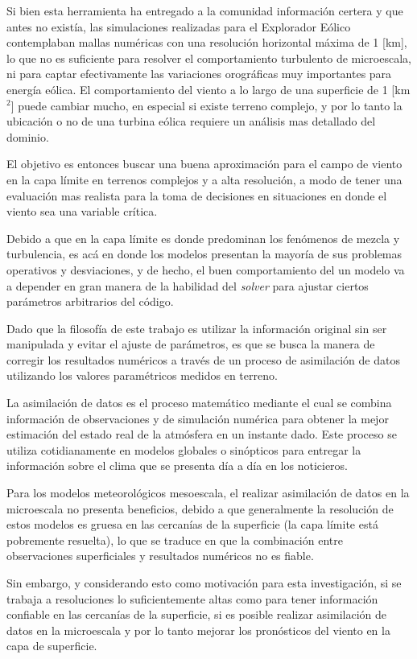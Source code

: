 Si bien esta herramienta ha entregado a la comunidad información certera y que antes no existía, las simulaciones realizadas para el Explorador Eólico contemplaban mallas numéricas con una resolución horizontal máxima de 1 [km], lo que no es suficiente para resolver el comportamiento turbulento de microescala, ni para captar efectivamente las variaciones orográficas muy importantes para energía eólica. El comportamiento del viento a lo largo de una superficie de 1 [km$^2$] puede cambiar mucho, en especial si existe terreno complejo, y por lo tanto la ubicación o no de una turbina eólica requiere un análisis mas detallado del dominio.

El objetivo es entonces buscar una buena aproximación para el campo de viento en la capa límite en terrenos complejos y a alta resolución, a modo de tener una evaluación mas realista para la toma de decisiones en situaciones en donde el viento sea una variable crítica.

Debido a que en la capa límite es donde predominan los fenómenos de mezcla y turbulencia, es acá en donde los modelos presentan la mayoría de sus problemas operativos y desviaciones, y de hecho, el buen comportamiento del un modelo va a depender en gran manera de la habilidad del \emph{solver} para ajustar ciertos parámetros arbitrarios del código. 

Dado que la filosofía de este trabajo es utilizar la información original sin ser manipulada y evitar el ajuste de parámetros, es que se busca la manera de corregir los resultados numéricos a través de un proceso de asimilación de datos utilizando los valores paramétricos medidos en terreno.

La asimilación de datos es el proceso matemático mediante el cual se combina información de observaciones y de simulación numérica para obtener la mejor estimación del estado real de la atmósfera en un instante dado. Este proceso se utiliza cotidianamente en modelos globales o sinópticos para entregar la información sobre el clima que se presenta día a día en los noticieros.

Para los modelos meteorológicos mesoescala, el realizar asimilación de datos en la microescala no presenta beneficios, debido a que generalmente la resolución de estos modelos es gruesa en las cercanías de la superficie (la capa límite está pobremente resuelta), lo que se traduce en que la combinación entre observaciones superficiales y resultados numéricos no es fiable.

Sin embargo, y considerando esto como motivación para esta investigación, si se trabaja a resoluciones lo suficientemente altas como para tener información confiable en las cercanías de la superficie, si es posible realizar asimilación de datos en la microescala y por lo tanto mejorar los pronósticos del viento en la capa de superficie.

